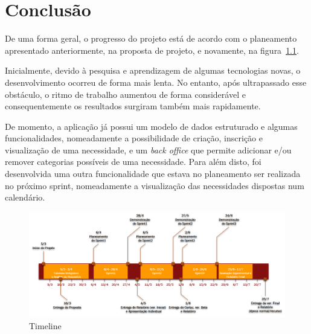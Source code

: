 \chapter{Conclusão}\label{sec:conclusion}

De uma forma geral, o progresso do projeto está de acordo com o planeamento apresentado anteriormente, na proposta de projeto, e novamente, na figura~\ref{fig:timeline}.

Inicialmente, devido à pesquisa e aprendizagem de algumas tecnologias novas, o desenvolvimento ocorreu de forma mais lenta. 
No entanto, após ultrapassado esse obstáculo, o ritmo de trabalho aumentou de forma considerável e consequentemente os resultados surgiram também mais rapidamente. 

De momento, a aplicação já possui um modelo de dados estruturado e algumas funcionalidades, nomeadamente a possibilidade de criação, 
inscrição e visualização de uma necessidade, e um \textit{back office} que permite adicionar e/ou remover categorias possíveis de uma necessidade. 
Para além disto, foi desenvolvida uma outra funcionalidade que estava no planeamento ser realizada no próximo sprint, nomeadamente a visualização das necessidades dispostas num calendário.

\begin{figure}[H]
  \centering 
  \includegraphics[scale=0.5]{figures/Timeline.png}
  \caption{Timeline}\label{fig:timeline}
\end{figure}